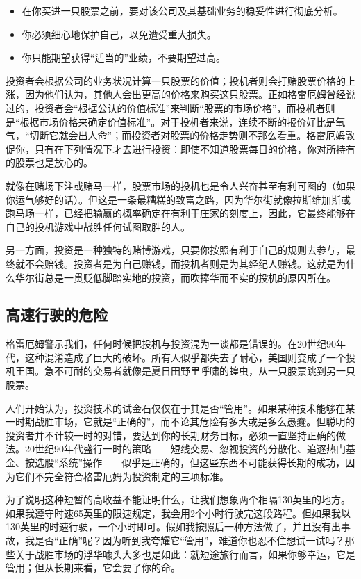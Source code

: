 \documentclass[12pt,oneside]{book}
\begin{document}
\begin{itemize}
\item 在你买进一只股票之前，要对该公司及其基础业务的稳妥性进行彻底分析。
\item 你必须细心地保护自己，以免遭受重大损失。
\item 你只能期望获得“适当的”业绩，不要期望过高。
\end{itemize}


投资者会根据公司的业务状况计算一只股票的价值；投机者则会打赌股票价格的上涨，因为他们认为，其他人会出更高的价格来购买这只股票。正如格雷厄姆曾经说过的，投资者会“根据公认的价值标准”来判断“股票的市场价格”，而投机者则是“根据市场价格来确定价值标准”。对于投机者来说，连续不断的报价好比是氧气，“切断它就会出人命”；而投资者对股票的价格走势则不那么看重。格雷厄姆敦促你，只有在下列情况下才去进行投资：即使不知道股票每日的价格，你对所持有的股票也是放心的。

就像在赌场下注或赌马一样，股票市场的投机也是令人兴奋甚至有利可图的（如果你运气够好的话）。但这是一条最糟糕的致富之路，因为华尔街就像拉斯维加斯或跑马场一样，已经把输赢的概率确定在有利于庄家的刻度上，因此，它最终能够在自己的投机游戏中战胜任何试图取胜的人。

另一方面，投资是一种独特的赌博游戏，只要你按照有利于自己的规则去参与，最终就不会赔钱。投资者是为自己赚钱，而投机者则是为其经纪人赚钱。这就是为什么华尔街总是一贯贬低脚踏实地的投资，而吹捧华而不实的投机的原因所在。

\subsection{高速行驶的危险}
格雷厄姆警示我们，任何时候把投机与投资混为一谈都是错误的。在20世纪90年代，这种混淆造成了巨大的破坏。所有人似乎都失去了耐心，美国则变成了一个投机王国。急不可耐的交易者就像是夏日田野里呼啸的蝗虫，从一只股票跳到另一只股票。

人们开始认为，投资技术的试金石仅仅在于其是否“管用”。如果某种技术能够在某一时期战胜市场，它就是“正确的”，而不论其危险有多大或是多么愚蠢。但聪明的投资者并不计较一时的对错，要达到你的长期财务目标，必须一直坚持正确的做法。20世纪90年代盛行一时的策略——短线交易、忽视投资的分散化、追逐热门基金、按选股“系统”操作——似乎是正确的，但这些东西不可能获得长期的成功，因为它们不完全符合格雷厄姆为投资制定的三项标准。

为了说明这种短暂的高收益不能证明什么，让我们想象两个相隔130英里的地方。如果我遵守时速65英里的限速规定，我会用2个小时行驶完这段路程。但如果我以130英里的时速行驶，一个小时即可。假如我按照后一种方法做了，并且没有出事故，我是否“正确”呢？因为听到我夸耀它“管用”，难道你也忍不住想试一试吗？那些关于战胜市场的浮华噱头大多也是如此：就短途旅行而言，如果你够幸运，它是管用；但从长期来看，它会要了你的命。
\end{document}
